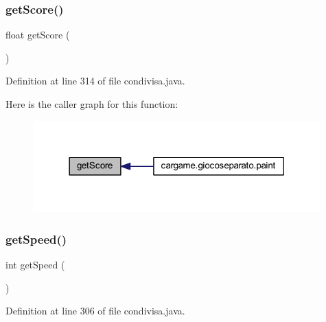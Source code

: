 \subsubsection{\texorpdfstring{get\+Score()}{getScore()}}
{\footnotesize\ttfamily float get\+Score (\begin{DoxyParamCaption}{ }\end{DoxyParamCaption})}



Definition at line 314 of file condivisa.\+java.

Here is the caller graph for this function\+:
\nopagebreak
\begin{figure}[H]
\begin{center}
\leavevmode
\includegraphics[width=314pt]{classcargame_1_1condivisa_ae2d024d6283b37c1e717238ba1c36909_icgraph}
\end{center}
\end{figure}
\mbox{\label{classcargame_1_1condivisa_ae2096b3878b5e714bf1d7b9d32389a5c}} 
\subsubsection{\texorpdfstring{get\+Speed()}{getSpeed()}}
{\footnotesize\ttfamily int get\+Speed (\begin{DoxyParamCaption}{ }\end{DoxyParamCaption})}



Definition at line 306 of file condivisa.\+java.

